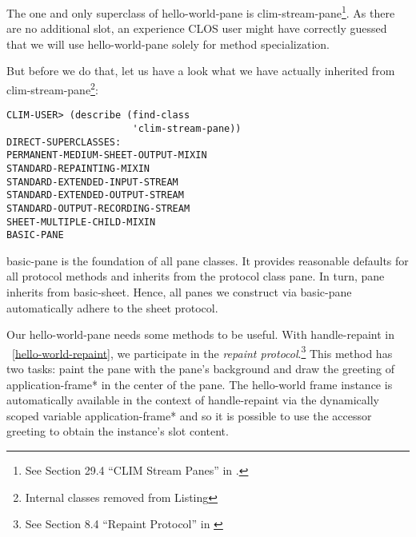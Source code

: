 \documentclass[twocolumn,a4paper]{article}
\newcommand {\concept} [1] {{\sl #1}\index{#1}}
\newcommand {\code}[1]{{\sffamily #1}}
\let\class\code
\let\method\code
\begin{document}
\lstset{style=inlinestyle}  

The one and only superclass of \class{hello-world-pane} is
\class{clim-stream-pane}\footnote{See Section 29.4 ``CLIM Stream
  Panes'' in \cite{clim-spec}.}. As there are no additional slot, an
experience CLOS user might have correctly guessed that we will use
\class{hello-world-pane} solely for method specialization.

But before we do that, let us have a look what we have actually
inherited from \class{clim-stream-pane}\footnote{Internal classes
  removed from Listing}:

\pagebreak %
\lstset{style=inlinestyle}
\begin{lstlisting}
CLIM-USER> (describe (find-class 
                      'clim-stream-pane))
DIRECT-SUPERCLASSES: 
PERMANENT-MEDIUM-SHEET-OUTPUT-MIXIN
STANDARD-REPAINTING-MIXIN
STANDARD-EXTENDED-INPUT-STREAM
STANDARD-EXTENDED-OUTPUT-STREAM
STANDARD-OUTPUT-RECORDING-STREAM
SHEET-MULTIPLE-CHILD-MIXIN
BASIC-PANE
\end{lstlisting}

\class{basic-pane} is the foundation of all pane classes. It provides
reasonable defaults for all protocol methods and inherits from the
protocol class \class{pane}. In turn, \class{pane} inherits from
\class{basic-sheet}. Hence, all panes we construct via
\class{basic-pane} automatically adhere to the sheet protocol.



Our \class{hello-world-pane} needs some methods to be useful. With
\method{handle-repaint} in \figurename~\ref{hello-world-repaint}, we
participate in the \concept{repaint protocol}.\footnote{See Section
  8.4 ``Repaint Protocol'' in \cite{clim-spec}} This method has two
tasks: paint the pane with the pane's background and draw the greeting
of \code{*application-frame*} in the center of the pane. The
\code{hello-world} frame instance is automatically available in the
context of \method{handle-repaint} via the dynamically scoped variable
\code{*application-frame*} and so it is possible to use the accessor
\code{greeting} to obtain the instance's slot content.
\end{document}

